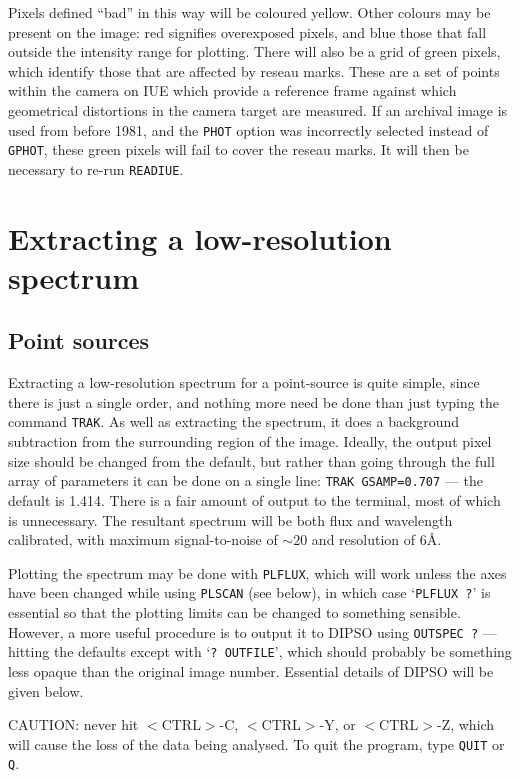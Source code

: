 Pixels defined ``bad'' in this way will be coloured yellow. Other colours may
be present on the image: red signifies overexposed pixels, and blue those 
that fall outside the intensity range for plotting. There will also be a
grid of green pixels, which identify those that are affected by reseau marks.
These are a set of points within the camera on IUE which provide a reference
frame against which geometrical distortions in the camera target are measured. 
If an archival image is used from before 1981, and the {\tt PHOT} option 
was incorrectly selected instead of {\tt GPHOT}, these green pixels will 
fail to cover the reseau marks. It will then be necessary to re-run 
{\tt READIUE}. 

\section{Extracting a low-resolution spectrum}

\subsection{Point sources}

Extracting a low-resolution spectrum for a point-source is quite simple, 
since there is just a single order, 
and nothing more need be done than just typing the
command {\tt TRAK}. As well as extracting the spectrum, it does a background
subtraction from the surrounding region of the image. Ideally, the output
pixel size should be changed from the default, but rather than going through
the full array of parameters it can be done on a single line: {\tt TRAK
GSAMP=0.707} --- the default is 1.414. There is a fair amount of output 
to the terminal, most of which is unnecessary. The resultant spectrum will 
be both flux and wavelength calibrated, with maximum signal-to-noise of
$\sim20$ and resolution of 6\AA. 

Plotting the spectrum may be done with {\tt PLFLUX}, which will work 
unless the axes have been changed while using {\tt PLSCAN} (see below),
in which case `{\tt PLFLUX ?}' is essential so that the plotting 
limits can be changed to something sensible. However, a more useful 
procedure is to output it to DIPSO using {\tt OUTSPEC ?} --- 
hitting the defaults
except with `{\tt ? OUTFILE}', which should probably be something less opaque
than the original image number. Essential details of DIPSO will be given
below. 

CAUTION: never hit $<$CTRL$>$-C, $<$CTRL$>$-Y, or $<$CTRL$>$-Z, which will 
cause the loss of the data being analysed. To quit the program, 
type {\tt QUIT} or {\tt Q}. 

